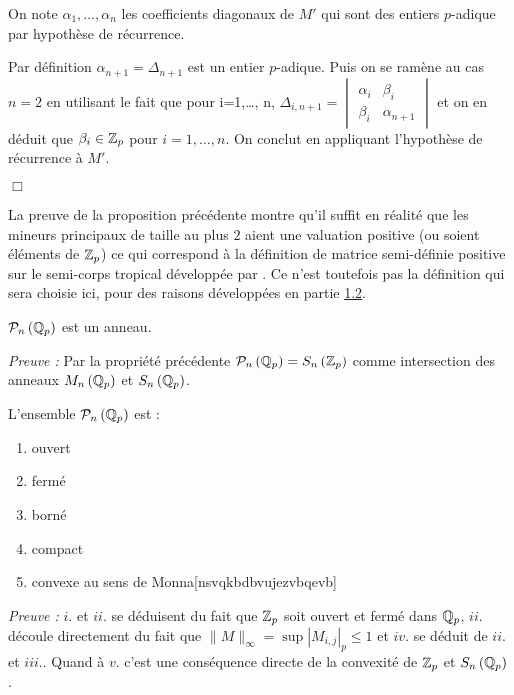 On note $ \alpha_1,\ldots, \alpha_n$ les coefficients diagonaux de $M'$ qui sont des entiers $p$-adique par hypothèse de récurrence. 


 Par définition $ \alpha_{n+1} = \Delta_{n+1}$ est un entier $p$-adique. Puis on se ramène au cas $n=2$ en utilisant le fait que pour i=1,\ldots, n, $\Delta_{i,n+1} = \begin{vmatrix} \alpha_{i} & \beta_{i}\\ \beta_{i} & \alpha_{n+1} \end{vmatrix} $ et on en déduit que $\beta_{i} \in  \mathbb {Z}_p $ pour $i=1,\ldots,n$. On conclut en appliquant l'hypothèse de récurrence à $M'$.


\hfill \ensuremath{\Box}

\begin{remarque}
	
	La preuve de la proposition précédente montre qu'il suffit en réalité que les mineurs principaux de taille au plus $2$ aient une valuation positive (ou soient éléments de $ \mathbb {Z}_p $) ce qui correspond à la définition de matrice semi-définie positive sur le semi-corps tropical développée par . Ce n'est toutefois pas la définition qui sera choisie ici, pour des raisons développées en partie \hyperlink{subsection.1.2}{1.2}.
\end{remarque}

\begin{propriete}
	$\mathcal{P}_n \left( \mathbb{Q}_p \right)$ est un anneau.
\end{propriete}

\textit{Preuve :} Par la propriété précédente $\mathcal{P}_n \left( \mathbb{Q}_p \right) = S_n \left(  \mathbb {Z}_p  \right)$ comme intersection des anneaux $M_n \left( \mathbb{Q}_p \right)$ et $S_n\left( \mathbb{Q}_p \right) $.
\begin{propriete}
	L'ensemble $\mathcal{P}_n \left( \mathbb{Q}_p \right)$ est :
	\begin{enumerate}[label=\roman*.]
	\item ouvert
	\item fermé
	\item borné
	\item compact
	\item convexe au sens de Monna[nsvqkbdbvujezvbqevb]

\end{enumerate}
\end{propriete}
\textit{Preuve :}
$i.$ et $ii.$ se déduisent du fait que $ \mathbb {Z}_p $ soit ouvert et fermé dans $\mathbb{Q}_p$, $ii.$ découle directement du fait que $\|M\|_\infty = \sup |M_{i,j}|_p \le 1$ et $iv.$ se déduit de $ii.$ et $iii.$.
Quand à $v.$ c'est une conséquence directe de la convexité de $ \mathbb {Z}_p $ et $S_n\left( \mathbb{Q}_p \right) $.
